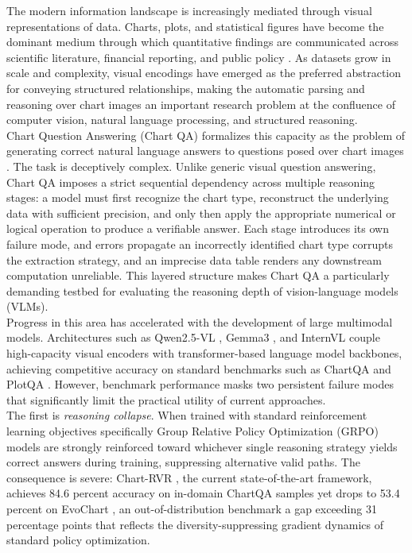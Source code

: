 \documentclass{iutbscthesis}
\begin{document}
The modern information landscape is increasingly mediated through visual representations of data. Charts, plots, and statistical figures have become the dominant medium through which quantitative findings are communicated across scientific literature, financial reporting, and public policy \cite{masry2022chartqa}. As datasets grow in scale and complexity, visual encodings have emerged as the preferred abstraction for conveying structured relationships, making the automatic parsing and reasoning over chart images an important research problem at the confluence of computer vision, natural language processing, and structured reasoning. 
\\
Chart Question Answering (Chart QA) formalizes this capacity as the problem of generating correct natural language answers to questions posed over chart images \cite{masry2022chartqa, masry2024chartinstruct}. The task is deceptively complex. Unlike generic visual question answering, Chart QA imposes a strict sequential dependency across multiple reasoning stages: a model must first recognize the chart type, reconstruct the underlying data with sufficient precision, and only then apply the appropriate numerical or logical operation to produce a verifiable answer. Each stage introduces its own failure mode, and errors propagate  an incorrectly identified chart type corrupts the extraction strategy, and an imprecise data table renders any downstream computation unreliable. This layered structure makes Chart QA a particularly demanding testbed for evaluating the reasoning depth of vision-language models (VLMs). \\
Progress in this area has accelerated with the development of large multimodal models. Architectures such as Qwen2.5-VL \cite{qwen25vl}, Gemma3 \cite{gemma3}, and InternVL \cite{internvl} couple high-capacity visual encoders with transformer-based language model backbones, \\ achieving  competitive 
accuracy on standard benchmarks such as ChartQA \cite{masry2022chartqa} and PlotQA \cite{plotqa}. However, benchmark performance masks two persistent failure modes that significantly limit the practical utility of current approaches. \\
The first is \textit{reasoning collapse}. When trained with standard reinforcement learning objectives specifically Group Relative Policy Optimization (GRPO) \cite{shao2024deepseekmath}  models are strongly reinforced toward whichever single reasoning strategy yields correct answers during training, suppressing alternative valid paths. The consequence is severe: Chart-RVR \cite{sinha2025chartrvr}, the current state-of-the-art framework, achieves 84.6 percent accuracy on in-domain ChartQA samples yet drops to 53.4 percent  on EvoChart \cite{chartx2024}, an out-of-distribution benchmark  a gap exceeding 31 percentage points that reflects the diversity-suppressing gradient dynamics of standard policy optimization. \\
\end{document}
